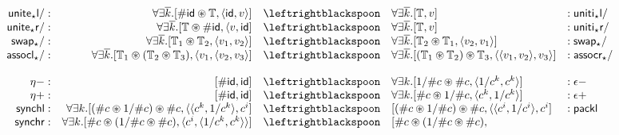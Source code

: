 \documentclass[a4paper,USenglish]{lipics-v2016-utf8x}
\newcommand{\hash}{\#}
\newcommand{\order}[1]{\hash #1}
\newcommand{\iorder}[1]{1/\hash #1}
\newcommand{\synchl}{\mathsf{{synchl}}}
\newcommand{\synchr}{\mathsf{{synchr}}}
\newcommand{\packl}{\mathsf{{packl}}}
\newcommand{\unitetl}{\mathsf{{unite_{\star}l}}}
\newcommand{\unititl}{\mathsf{{uniti_{\star}l}}}
\newcommand{\unitetr}{\mathsf{{unite_{\star}r}}}
\newcommand{\unititr}{\mathsf{{uniti_{\star}r}}}
\newcommand{\swapt}{\mathsf{{swap_{\star}}}}
\newcommand{\assoclt}{\mathsf{{assocl_{\star}}}}
\newcommand{\assocrt}{\mathsf{{assocr_{\star}}}}
\newcommand{\idiso}{\mathsf{{id}}}
\begin{document}
\begin{figure}[t]
{\footnotesize
\[\begin{array}{rrcll}
\unitetl/ :& \forall\exists{\overline{k}}.[\order{\idiso} \circledast \mathbb{T},
                                                   \langle \idiso,v \rangle]
  & \leftrightblackspoon &
                   \forall\exists{\overline{k}}.[\mathbb{T},v]
  &: \unititl/ \\
\unitetr/ :& \forall\exists{\overline{k}}.[\mathbb{T} \circledast \order{\idiso},
                                                    \langle v,\idiso]
  & \leftrightblackspoon &
                   \forall\exists{\overline{k}}.[\mathbb{T},v]
  &: \unititr/ \\
\swapt/ :& \forall\exists{\overline{k}}.[\mathbb{T}_1 \circledast \mathbb{T}_2,
                                                   \langle v_1,v_2 \rangle]
 & \leftrightblackspoon &
                  \forall\exists{\overline{k}}.[\mathbb{T}_2 \circledast \mathbb{T}_1,
                                                  \langle v_2,v_1 \rangle]
  &: \swapt/ \\
  \assoclt/ :& \forall\exists{\overline{k}}.
               [\mathbb{T}_1 \circledast (\mathbb{T}_2 \circledast \mathbb{T}_3),
                                        \langle v_1,\langle v_2,v_3 \rangle]
  & \leftrightblackspoon &
                      \forall\exists{\overline{k}}.
               [(\mathbb{T}_1 \circledast \mathbb{T}_2) \circledast \mathbb{T}_3,
                                       \langle \langle v_1,v_2 \rangle , v_3 \rangle]
  &: \assocrt/ \\
\\
\eta- :& [\order{\idiso},\idiso] & \leftrightblackspoon &
  \forall\exists{k}.[\iorder{c} \circledast \order{c}, \langle 1/c^k, c^k  \rangle]
  & : \epsilon- \\
\eta+ :& [\order{\idiso},\idiso] & \leftrightblackspoon &
  \forall\exists{k}.[\order{c} \circledast \iorder{c}, \langle c^k,1/c^k \rangle]
  & : \epsilon+ \\
\synchl :& \forall\exists{k}.[(\order{c}\circledast\iorder{c})\circledast\order{c},
  \langle \langle c^k,1/c^k \rangle, c^i]
  & \leftrightblackspoon &
  [(\order{c}\circledast\iorder{c})\circledast\order{c},
    \langle \langle c^i,1/c^i \rangle, c^i]
  & : \packl \\
\synchr :& \forall\exists{k}.[\order{c}\circledast(\iorder{c}\circledast\order{c}),
  \langle c^i, \langle 1/c^k, c^k \rangle \rangle]
  & \leftrightblackspoon &
   [\order{c}\circledast(\iorder{c}\circledast\order{c}),

\end{array}\]}
\end{figure}
\end{document}
